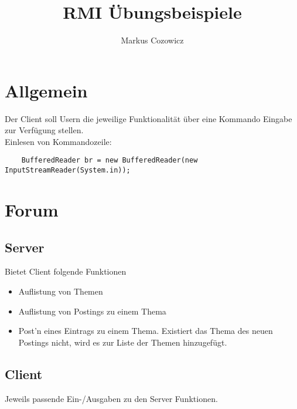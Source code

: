 \documentclass{article}
\begin{document}
\title{RMI \"Ubungsbeispiele}

\author{Markus Cozowicz}

\section{Allgemein}

Der Client soll Usern die jeweilige Funktionalit\"at \"uber eine Kommando Eingabe zur Verf\"ugung stellen.\\

\noindent Einlesen von Kommandozeile:\\
\begin{verbatim}
	BufferedReader br = new BufferedReader(new InputStreamReader(System.in));
\end{verbatim}


\section{Forum}

\subsection{Server}

Bietet Client folgende Funktionen

\begin{itemize}
	\item Auflistung von Themen
	\item Auflistung von Postings zu einem Thema
	\item Post'n eines Eintrags zu einem Thema.
	      Existiert das Thema des neuen Postings nicht, wird es zur Liste der Themen hinzugef\"ugt.
\end{itemize}

\subsection{Client}

Jeweils passende Ein-/Ausgaben zu den Server Funktionen.
\end{document}
